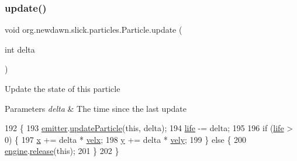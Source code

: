 \subsubsection{\texorpdfstring{update()}{update()}}
{\footnotesize\ttfamily void org.\+newdawn.\+slick.\+particles.\+Particle.\+update (\begin{DoxyParamCaption}\item[{int}]{delta }\end{DoxyParamCaption})\hspace{0.3cm}{\ttfamily [inline]}}

Update the state of this particle


\begin{DoxyParams}{Parameters}
{\em delta} & The time since the last update \\
\hline
\end{DoxyParams}

\begin{DoxyCode}
192                                   \{
193         \mbox{\hyperlink{classorg_1_1newdawn_1_1slick_1_1particles_1_1_particle_a1293f2f734f0862d1263330c0d9c77c9}{emitter}}.\mbox{\hyperlink{interfaceorg_1_1newdawn_1_1slick_1_1particles_1_1_particle_emitter_ac0792f19fdebd62a321bcdc487e0cba5}{updateParticle}}(\textcolor{keyword}{this}, delta);
194         \mbox{\hyperlink{classorg_1_1newdawn_1_1slick_1_1particles_1_1_particle_a361d2a9d01b66d38d90496c096970aab}{life}} -= delta;
195         
196         \textcolor{keywordflow}{if} (\mbox{\hyperlink{classorg_1_1newdawn_1_1slick_1_1particles_1_1_particle_a361d2a9d01b66d38d90496c096970aab}{life}} > 0) \{
197             \mbox{\hyperlink{classorg_1_1newdawn_1_1slick_1_1particles_1_1_particle_ae1ee7d5a72b34bbdb44110dfa2795674}{x}} += delta * \mbox{\hyperlink{classorg_1_1newdawn_1_1slick_1_1particles_1_1_particle_a9056abd13cffd1064051f9a34a3e70ef}{velx}};
198             \mbox{\hyperlink{classorg_1_1newdawn_1_1slick_1_1particles_1_1_particle_ad784e37c1fdad77abc886521b8e907b2}{y}} += delta * \mbox{\hyperlink{classorg_1_1newdawn_1_1slick_1_1particles_1_1_particle_a799a64a459185f49bcf1e71a53e59014}{vely}};
199         \} \textcolor{keywordflow}{else} \{
200             \mbox{\hyperlink{classorg_1_1newdawn_1_1slick_1_1particles_1_1_particle_a92d857a3e2fba0ed564ad8e29ca3b81e}{engine}}.\mbox{\hyperlink{classorg_1_1newdawn_1_1slick_1_1particles_1_1_particle_system_a942eda71ebce01671173f8e203327c0c}{release}}(\textcolor{keyword}{this});
201         \}
202     \}
\end{DoxyCode}


